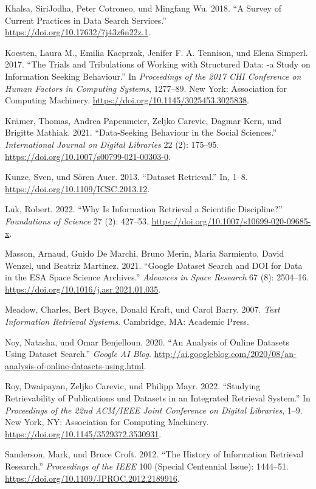 \documentclass[a4paper,
fontsize=11pt,
oneside,
numbers=noperiodatend,
parskip=half-,
bibliography=totoc,
final
]{scrartcl}
\begin{document}
Khalsa, SiriJodha, Peter Cotroneo, und Mingfang Wu. 2018. \enquote{A
Survey of Current Practices in Data Search Services.}
\url{https://doi.org/10.17632/7j43z6n22z.1}.

Koesten, Laura M., Emilia Kacprzak, Jenifer F. A. Tennison, und Elena
Simperl. 2017. \enquote{The Trials and Tribulations of Working with
Structured Data: -a Study on Information Seeking Behaviour.} In
\emph{Proceedings of the 2017 CHI Conference on Human Factors in
Computing Systems}, 1277--89. New York: Association for Computing
Machinery. \url{https://doi.org/10.1145/3025453.3025838}.

Krämer, Thomas, Andrea Papenmeier, Zeljko Carevic, Dagmar Kern, und
Brigitte Mathiak. 2021. \enquote{Data-Seeking Behaviour in the Social
Sciences.} \emph{International Journal on Digital Libraries} 22 (2):
175--95. \url{https://doi.org/10.1007/s00799-021-00303-0}.

Kunze, Sven, und Sören Auer. 2013. \enquote{Dataset Retrieval.} In,
1--8. \url{https://doi.org/10.1109/ICSC.2013.12}.

Luk, Robert. 2022. \enquote{Why Is Information Retrieval a Scientific
Discipline?} \emph{Foundations of Science} 27 (2): 427--53.
\url{https://doi.org/10.1007/s10699-020-09685-x}.

Masson, Arnaud, Guido De Marchi, Bruno Merin, Maria Sarmiento, David
Wenzel, und Beatriz Martinez. 2021. \enquote{Google Dataset Search and
DOI for Data in the ESA Space Science Archives.} \emph{Advances in Space
Research} 67 (8): 2504--16.
\url{https://doi.org/10.1016/j.asr.2021.01.035}.

Meadow, Charles, Bert Boyce, Donald Kraft, und Carol Barry. 2007.
\emph{Text Information Retrieval Systems}. Cambridge, MA: Academic
Press.

Noy, Natasha, und Omar Benjelloun. 2020. \enquote{An Analysis of Online
Datasets Using Dataset Search.} \emph{Google AI Blog}.
\url{http://ai.googleblog.com/2020/08/an-analysis-of-online-datasets-using.html}.

Roy, Dwaipayan, Zeljko Carevic, und Philipp Mayr. 2022.
\enquote{Studying Retrievability of Publications und Datasets in an
Integrated Retrieval System.} In \emph{Proceedings of the 22nd ACM/IEEE
Joint Conference on Digital Libraries}, 1--9. New York, NY: Association
for Computing Machinery. \url{https://doi.org/10.1145/3529372.3530931}.

Sanderson, Mark, und Bruce Croft. 2012. \enquote{The History of
Information Retrieval Research.} \emph{Proceedings of the IEEE} 100
(Special Centennial Issue): 1444--51.
\url{https://doi.org/10.1109/JPROC.2012.2189916}.
\end{document}

